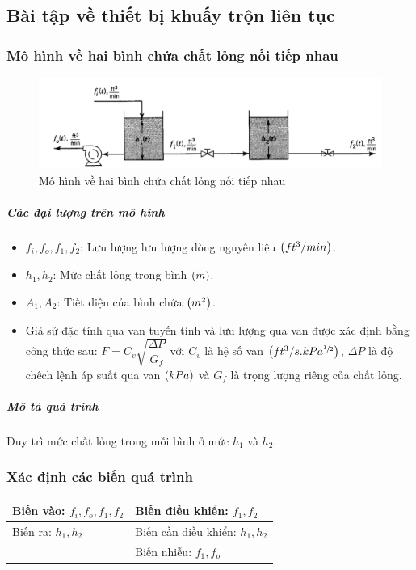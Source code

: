 \subsection{Bài tập về thiết bị khuấy trộn liên tục}
\subsubsection{Mô hình về hai bình chứa chất lỏng nối tiếp nhau}
    \begin{figure}[htp]
        \begin{center}
            \includegraphics[scale=0.4]{section/mohinhhoalythuyet/images/binhchuachatlong-2binh}
        \end{center}
        \caption{Mô hình về hai bình chứa chất lỏng nối tiếp nhau} \label{Fig:binhchuachatlong-2binh}
    \end{figure}

\subparagraph{Các đại lượng trên mô hình}
    \begin{itemize}
		\item $f_i, f_o, f_1, f_2$: Lưu lượng lưu lượng dòng nguyên liệu $\left({ft^3/min}\right)$.
		\item $h_1, h_2$: Mức chất lỏng trong bình $\left({m}\right)$.
        \item $A_1, A_2$: Tiết diện của bình chứa $\left({m^2}\right)$.
        \item Giả sử đặc tính qua van tuyến tính và lưu lượng qua van được xác định bằng công thức sau: $F = C_v \sqrt{\dfrac{\Delta P}{G_f}}$ với $C_v$ là hệ số van $\left({ft^3/s.kPa^{\sfrac{1}{2}}}\right)$, $\Delta P$ là độ chêch lệnh áp suất qua van $\left({kPa}\right)$ và $G_f$ là trọng lượng riêng của chất lỏng.
	\end{itemize}

\subparagraph{Mô tả quá trình} Duy trì mức chất lỏng trong mỗi bình ở mức $h_1$ và $h_2$.

\subsubsection{Xác định các biến quá trình}
    \begin{center}
        \begin{tabular}{l|l}
            Biến vào: $f_i, f_o, f_1, f_2$ & Biến điều khiển: $f_1, f_2$ \\ \hline
            Biến ra: $h_1, h_2$ & Biến cần điều khiển: $h_1, h_2$\\ \hline
            & Biến nhiễu: $f_1, f_o$
        \end{tabular}
    \end{center}

